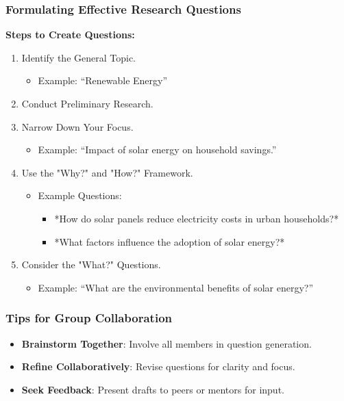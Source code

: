 \documentclass[aspectratio=169]{beamer}
\begin{document}
\begin{frame}[fragile]
    \frametitle{Formulating Effective Research Questions}
    \textbf{Steps to Create Questions:}
    \begin{enumerate}
        \item Identify the General Topic.
              \begin{itemize}
                  \item Example: “Renewable Energy”
              \end{itemize}
        \item Conduct Preliminary Research.
        \item Narrow Down Your Focus.
              \begin{itemize}
                  \item Example: “Impact of solar energy on household savings.”
              \end{itemize}
        \item Use the "Why?" and "How?" Framework.
              \begin{itemize}
                  \item Example Questions:
                      \begin{itemize}
                          \item *How do solar panels reduce electricity costs in urban households?*
                          \item *What factors influence the adoption of solar energy?*
                      \end{itemize}
              \end{itemize}
        \item Consider the "What?" Questions.
              \begin{itemize}
                  \item Example: “What are the environmental benefits of solar energy?”
              \end{itemize}
    \end{enumerate}
\end{frame}

\begin{frame}[fragile]
    \frametitle{Tips for Group Collaboration}
    \begin{itemize}
        \item \textbf{Brainstorm Together}: Involve all members in question generation.
        \item \textbf{Refine Collaboratively}: Revise questions for clarity and focus.
        \item \textbf{Seek Feedback}: Present drafts to peers or mentors for input.
    \end{itemize}
\end{frame}
\end{document}
